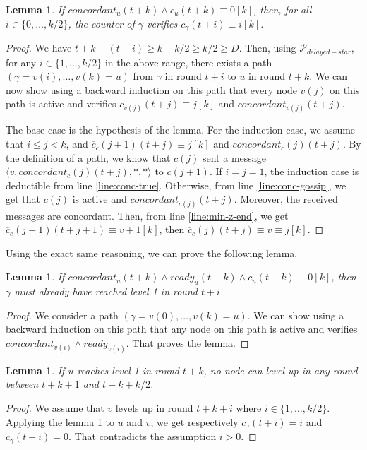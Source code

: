 \documentclass[11pt,letterpaper]{article}
\renewcommand{\leq}{\leqslant}
\renewcommand{\geq}{\geqslant}
\newtheorem{lem}[thm]{Lemma}
\newcommand{\cent}{\gamma}
\begin{document}
\begin{lem} \label{lem:conc-safety}
	If $concordant_u(t+k) \wedge c_u(t+k) \equiv 0 [k]$, then, for all $i \in \{0, \dots, k/2\}$, the counter of $\cent$ verifies $c_\cent(t+i) \equiv i [k]$.
\end{lem}
\begin{proof}
	We have $t+k - (t+i) \geq k - k/2 \geq k/2 \geq D$.
	Then, using $\mathcal{P}_{delayed-star}$, for any $i \in \{1, \dots, k/2\}$ in the above range, there exists a path $(\cent = v(i), \dots, v(k) = u)$ from $\cent$ in round $t+i$ to $u$ in round $t+k$. 
	We can now show using a backward induction on this path that every node $v(j)$ on this path is active and verifies $c_{v(j)}(t+j) \equiv j [k]$ and $concordant_{v(j)}(t+j)$.

	The base case is the hypothesis of the lemma.
	For the induction case, we assume that $i \leq j < k$, and $\overline{c}_c(j+1)(t+j) \equiv j [k]$ and $concordant_c(j)(t+j)$.
	By the definition of a path, we know that $c(j)$ sent a message $\langle v, concordant_c(j)(t+j), *, * \rangle$ to $c(j+1)$.
	If $i = j = 1$, the induction case is deductible from line \ref{line:conc-true}.
	Otherwise, from line \ref{line:conc-gossip}, we get that $c(j)$ is active and $concordant_{c(j)}(t+j)$. Moreover, the received messages are concordant.
	Then, from line \ref{line:min-z-end}, we get $\overline{c}_c(j+1)(t+j+1) \equiv v+1 [k]$, then $\overline{c}_c(j)(t+j) \equiv v \equiv j [k]$.
\end{proof}

\noindent Using the exact same reasoning, we can prove the following lemma.
\begin{lem} \label{lem:conc-safety-bis}
	If $concordant_u(t+k) \wedge ready_u(t+k) \wedge c_u(t+k) \equiv 0 [k]$, then $\cent$ must already have reached level 1 in round $t+i$.
\end{lem}
\begin{proof}
	We consider a path $(\cent = v(0), \dots, v(k) = u)$.
	We can show using a backward induction on this path that any node on this path is active and verifies $concordant_{v(i)} \wedge ready_{v(i)}$.
	That proves the lemma.
\end{proof}

\begin{lem} \label{lem:no-close-level2}
	If $u$ reaches level 1 in round $t+k$, no node can level up in any round between $t+k+1$ and $t+k+k/2$.
\end{lem}
\begin{proof}
	We assume that $v$ levels up in round $t+k+i$ where $i \in \{1, \dots, k/2\}$.
	Applying the lemma \ref{lem:conc-safety} to $u$ and $v$, we get respectively $c_\cent(t+i) = i$ and $c_\cent(t+i) = 0$.
	That contradicts the assumption $i > 0$.
\end{proof}
\end{document}
